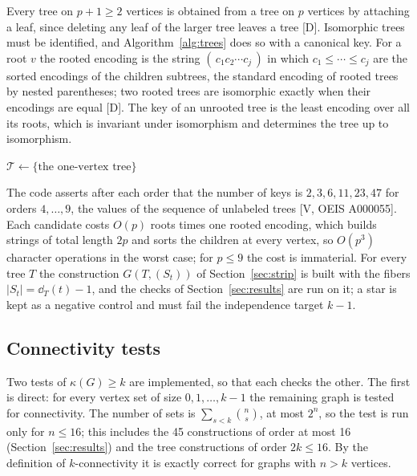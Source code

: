 Every tree on $p+1\ge2$ vertices is obtained from a tree on $p$ vertices by attaching a leaf, since deleting any leaf of the larger tree leaves a tree [D].
Isomorphic trees must be identified, and Algorithm~\ref{alg:trees} does so with a canonical key.
For a root $v$ the rooted encoding is the string $(\,c_1c_2\cdots c_j\,)$ in which $c_1\le\cdots\le c_j$ are the sorted encodings of the children subtrees, the standard encoding of rooted trees by nested parentheses; two rooted trees are isomorphic exactly when their encodings are equal [D].
The key of an unrooted tree is the least encoding over all its roots, which is invariant under isomorphism and determines the tree up to isomorphism.

\begin{algorithm}[t]
\caption{Trees of order $4,\ldots,9$ by leaf augmentation with canonical keys (EXP-001, \texttt{grow\_trees}, \texttt{tree\_key})}\label{alg:trees}
$\mathcal T\leftarrow\{\text{the one-vertex tree}\}$\;
\end{algorithm}

The code asserts after each order that the number of keys is $2,3,6,11,23,47$ for orders $4,\ldots,9$, the values of the sequence of unlabeled trees [V, OEIS A000055].
Each candidate costs $O(p)$ roots times one rooted encoding, which builds strings of total length $2p$ and sorts the children at every vertex, so $O(p^3)$ character operations in the worst case; for $p\le9$ the cost is immaterial.
For every tree $T$ the construction $G(T,(S_t))$ of Section~\ref{sec:strip} is built with the fibers $|S_t|=\dd_T(t)-1$, and the checks of Section~\ref{sec:results} are run on it; a star is kept as a negative control and must fail the independence target $k-1$.

\subsection{Connectivity tests}\label{sec:comp-conn}

Two tests of $\kappa(G)\ge k$ are implemented, so that each checks the other.
The first is direct: for every vertex set of size $0,1,\ldots,k-1$ the remaining graph is tested for connectivity.
The number of sets is $\sum_{s<k}\binom ns$, at most $2^n$, so the test is run only for $n\le16$; this includes the 45 constructions of order at most 16 (Section~\ref{sec:results}) and the tree constructions of order $2k\le16$.
By the definition of $k$-connectivity it is exactly correct for graphs with $n>k$ vertices.

